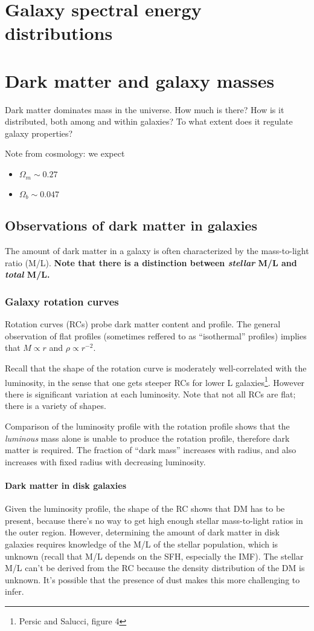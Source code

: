 \documentclass{article}
\begin{document}
\newpage
\section{Galaxy spectral energy distributions}

\newpage
\section{Dark matter and galaxy masses}
Dark matter dominates mass in the universe. How much is there? How is
it distributed, both among and within galaxies? To what extent does it
regulate galaxy properties?

Note from cosmology: we expect
\begin{itemize}
    \item $\Omega_{m} \sim 0.27$
    \item $\Omega_{b} \sim 0.047$
\end{itemize}

\subsection{Observations of dark matter in galaxies}
The amount of dark matter in a galaxy is often characterized by the
mass-to-light ratio (M/L). \textbf{Note that there is a distinction
between \emph{stellar} M/L and \emph{total} M/L.}

\subsubsection{Galaxy rotation curves}
Rotation curves (RCs) probe dark matter content and profile. The general
observation of flat profiles (sometimes reffered to as ``isothermal'' profiles)
implies that $M \propto r$ and $\rho \propto r^{-2}$.

Recall that the shape of the rotation curve is moderately well-correlated
with the luminosity, in the sense that one gets steeper RCs for lower L
galaxies\footnote{Persic and Salucci, figure 4}. However there is significant
variation at each luminosity. Note that not all RCs are flat; there is a
variety of shapes.

Comparison of the luminosity profile with the rotation profile shows that
the \emph{luminous} mass alone is unable to produce the rotation profile,
therefore dark matter is required. The fraction of ``dark mass'' increases
with radius, and also increases with fixed radius with decreasing luminosity.

\paragraph{Dark matter in disk galaxies}
Given the luminosity profile, the shape of the RC shows that DM has to be
present, because there's no way to get high enough stellar mass-to-light ratios
in the outer region.  However, determining the amount of dark matter in disk
galaxies requires knowledge of the M/L of the stellar population, which is
unknown (recall that M/L depends on the SFH, especially the IMF).  The stellar
M/L can't be derived from the RC because the density distribution of the DM is
unknown.  It's possible that the presence of dust makes this more challenging
to infer.
\end{document}
